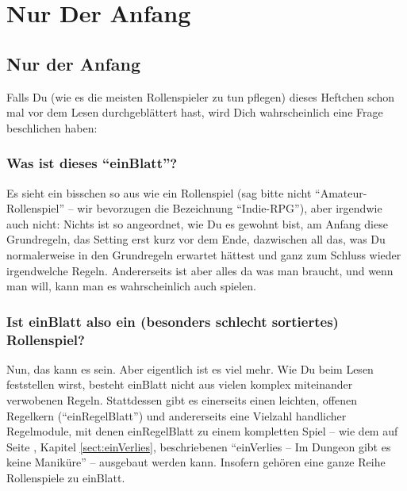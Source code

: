 \part {Nur Der Anfang}
\chapter {Nur der Anfang}

Falls Du (wie es die meisten Rollenspieler zu tun pflegen) dieses Heftchen schon mal vor dem Lesen durchgeblättert hast, wird Dich wahrscheinlich eine Frage beschlichen haben:

\section {Was ist dieses "`einBlatt"'?}
Es sieht ein bisschen so aus wie ein Rollenspiel (sag bitte nicht "`Amateur-Rollenspiel"' -- wir bevorzugen die Bezeichnung "`Indie-RPG"'), aber irgendwie auch nicht: Nichts ist so angeordnet, wie Du es gewohnt bist, am Anfang diese Grundregeln, das Setting erst kurz vor dem Ende, dazwischen all das, was Du normalerweise in den Grundregeln erwartet hättest und ganz zum Schluss wieder irgendwelche Regeln. Andererseits ist aber alles da was man braucht, und wenn man will, kann man es wahrscheinlich auch spielen.

\section {Ist einBlatt also ein (besonders schlecht sortiertes) Rollenspiel?}
Nun, das kann es sein. Aber eigentlich ist es viel mehr. Wie Du beim Lesen feststellen wirst, besteht einBlatt nicht aus vielen komplex miteinander verwobenen Regeln. Stattdessen gibt es einerseits einen leichten, offenen Regelkern ("`einRegelBlatt"') und andererseits eine Vielzahl handlicher Regelmodule, mit denen einRegelBlatt zu einem kompletten Spiel -- wie dem auf Seite \pageref {sect:einVerlies}, Kapitel \ref {sect:einVerlies}, beschriebenen "`einVerlies -- Im Dungeon gibt es keine Maniküre"' -- ausgebaut werden kann. Insofern gehören eine ganze Reihe Rollenspiele zu einBlatt. 

